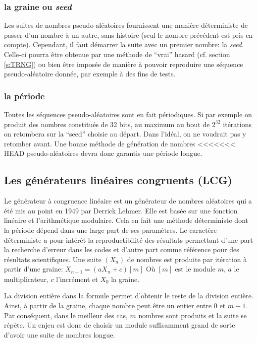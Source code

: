 \documentclass{scrartcl}
\begin{document}
\subsubsection{la graine ou \textit{seed}}
Les suites de nombres pseudo-aléatoires fournissent une manière déterministe de
passer d'un nombre à un autre, sans histoire (seul le nombre précédent est pris
en compte). Cependant, il faut démarrer la suite avec un premier nombre: la
\textit{seed}. Celle-ci pourra être obtenue par une méthode de ``vrai'' hasard
(cf. section \ref{s:TRNG}) ou bien être imposée de manière à pouvoir reproduire
une séquence pseudo-aléatoire donnée, par exemple à des fins de tests.
\subsubsection{la période}
Toutes les séquences pseudo-aléatoires sont en fait périodiques. Si par exemple
on produit des nombres constitués de 32 bits, au maximum au bout de $2^{32}$
itérations on retombera sur la ``seed'' choisie au départ. Dans l'idéal, on ne
voudrait pas y retomber avant. Une bonne méthode de génération de nombres
<<<<<<< HEAD
pseudo-aléatoires devra donc garantis une période longue.

\subsection{Les générateurs linéaires congruents (LCG)}\label{s:lcg}
Le générateur à congruence linéaire est un générateur de nombres aléatoires qui
a été mis au point en 1949 par Derrick Lehmer. Elle est basée sur une fonction
linéaire et l'arithmétique modulaire. Cela en fait une méthode déterministe dont
la période dépend dans une large part de ses paramètres.  Le caractère
déterministe a pour intérêt la reproductibilité des résultats permettant d'une
part la recherche d'erreur dans les codes et d'autre part comme référence pour
des résultats scientifiques.  Une suite $(X_n)$ de nombres est produite par
itération à partir d'une graine: $X_{n+1} = (a X_n +c)[m]$ Où $[m]$ est le
module $m$, $a$ le multiplicateur, $c$ l'incrément et $X_0$ la graine.

La division entière dans la formule permet d'obtenir le reste de la division
entière. Ainsi, à partir de la graine, chaque nombre peut être un entier entre 0
et $m-1$.  Par conséquent, dans le meilleur des cas, $m$ nombres sont produits
et la suite se répète.  Un enjeu est donc de choisir un module suffisamment
grand de sorte d'avoir une suite de nombres longue.
\end{document}
